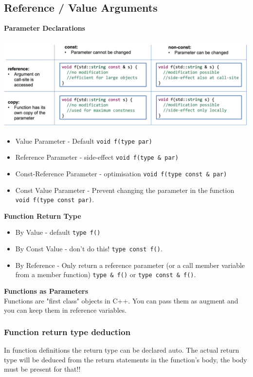 \subsection{Reference / Value Arguments}
\textbf{Parameter Declarations}
\begin{center}
	\includegraphics[width=0.75\linewidth]{images/functionparameters}	
\end{center}

\begin{itemize}
  \itemsep -0.5em 
  \item Value Parameter - Default \lstinline|void f(type par)|
  \item Reference Parameter - side-effect \lstinline|void f(type & par)|
  \item Const-Reference Parameter - optimisation \lstinline|void f(type const & par)|
  \item Const Value Parameter - Prevent changing the parameter in the function \lstinline|void f(type const par)|.
\end{itemize}

\textbf{Function Return Type}
\begin{itemize}
  \itemsep -0.5em 
  \item By Value - default \lstinline|type f()|
  \item By Const Value - don't do this!  \lstinline|type const f()|.
  \item By Reference - Only return a reference parameter (or a call member variable from a member function) \lstinline|type & f()| or \lstinline|type const & f()|.
\end{itemize}

\textbf{Functions as Parameters} \\
Functions are "first class" objects in C++. You can pass them as augment and you can keep them in reference variables.

\subsubsection{Function return type deduction}
In function definitions the return type can be declared auto.  The actual return type will be deduced from the return statements in the function's body, the body must be present for that!!\\

